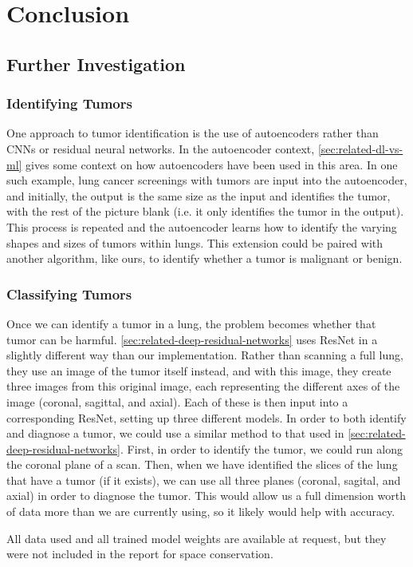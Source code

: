 \documentclass[10pt,twocolumn,letterpaper]{article}
\begin{document}
\section{Conclusion} \label{sec:conclusion}

   \subsection{Further Investigation} \label{sec:further}

      \subsubsection{Identifying Tumors} \label{sec:id-tumor}
    
         One approach to tumor identification is the use of autoencoders rather than CNNs or residual neural networks. In the autoencoder context, \ref{sec:related-dl-vs-ml} gives some context on how autoencoders have been used in this area. In one such example, lung cancer screenings with tumors are input into the autoencoder, and initially, the output is the same size as the input and identifies the tumor, with the rest of the picture blank (i.e. it only identifies the tumor in the output). This process is repeated and the autoencoder learns how to identify the varying shapes and sizes of tumors within lungs. This extension could be paired with another algorithm, like ours, to identify whether a tumor is malignant or benign. 
    
      \subsubsection{Classifying Tumors} \label{sec:classify-tumor}
    
         Once we can identify a tumor in a lung, the problem becomes whether that tumor can be harmful. \ref{sec:related-deep-residual-networks} uses ResNet in a slightly different way than our implementation. Rather than scanning a full lung, they use an image of the tumor itself instead, and with this image, they create three images from this original image, each representing the different axes of the image (coronal, sagittal, and axial). Each of these is then input into a corresponding ResNet, setting up three different models. In order to both identify and diagnose a tumor, we could use a similar method to that used in \ref{sec:related-deep-residual-networks}. First, in order to identify the tumor, we could run along the coronal plane of a scan. Then, when we have identified the slices of the lung that have a tumor (if it exists), we can use all three planes (coronal, sagital, and axial) in order to diagnose the tumor. This would allow us a full dimension worth of data more than we are currently using, so it likely would help with accuracy. 


  All data used and all trained model weights are available at request, but they were not included in the report for space conservation.


{\small



}
\end{document}
